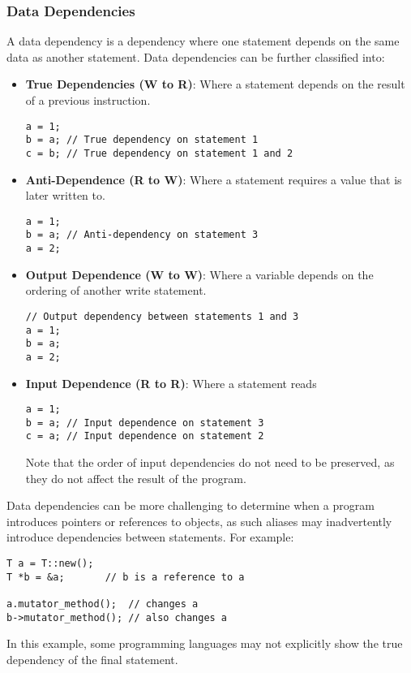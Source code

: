 \documentclass{article}
\begin{document}
\subsubsection{Data Dependencies}
A data dependency is a dependency where one statement depends on the
same data as another statement. Data dependencies can be further
classified into:
\begin{itemize}
    \item \textbf{True Dependencies (W to R)}: Where a
          statement depends on the result of a previous
          instruction.
          \begin{verbatim}
a = 1;
b = a; // True dependency on statement 1
c = b; // True dependency on statement 1 and 2
\end{verbatim}
    \item \textbf{Anti-Dependence (R to W)}: Where a
          statement requires a value that is later written to.
          \begin{verbatim}
a = 1;
b = a; // Anti-dependency on statement 3
a = 2;
\end{verbatim}
    \item \textbf{Output Dependence (W to W)}: Where a
          variable depends on the ordering of another write
          statement.
          \begin{verbatim}
// Output dependency between statements 1 and 3
a = 1;
b = a;
a = 2;
\end{verbatim}
    \item \textbf{Input Dependence (R to R)}: Where a
          statement reads
          \begin{verbatim}
a = 1;
b = a; // Input dependence on statement 3
c = a; // Input dependence on statement 2
\end{verbatim}
          Note that the order of input dependencies do not need to be
          preserved, as they do not affect the result of the program.
\end{itemize}
Data dependencies can be more challenging to determine when a program
introduces pointers or references to objects, as such aliases may
inadvertently introduce dependencies between statements. For example:
\begin{verbatim}
T a = T::new();
T *b = &a;       // b is a reference to a

a.mutator_method();  // changes a
b->mutator_method(); // also changes a
\end{verbatim}
In this example, some programming languages may not explicitly show the
true dependency of the final statement.
\end{document}
